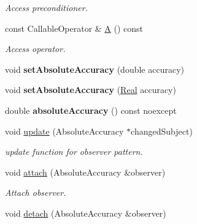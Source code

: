 \begin{DoxyCompactItemize}
\begin{DoxyCompactList}\small\item\em Access preconditioner. \end{DoxyCompactList}\item 
const Callable\+Operator \& \hyperlink{classSpacy_1_1CG_1_1Solver_a9b0fa76350c42fb60b2fbeb40b343fa2}{A} () const 
\begin{DoxyCompactList}\small\item\em Access operator. \end{DoxyCompactList}\item 
\hypertarget{classSpacy_1_1Mixin_1_1AbsoluteAccuracy_a71cfcdc0c504be63c18c3e78df157738}{}void {\bfseries set\+Absolute\+Accuracy} (double accuracy)\label{classSpacy_1_1Mixin_1_1AbsoluteAccuracy_a71cfcdc0c504be63c18c3e78df157738}

\item 
\hypertarget{classSpacy_1_1Mixin_1_1AbsoluteAccuracy_ad099a4a0a770133b56acaaf8783d4ba6}{}void {\bfseries set\+Absolute\+Accuracy} (\hyperlink{classSpacy_1_1Real}{Real} accuracy)\label{classSpacy_1_1Mixin_1_1AbsoluteAccuracy_ad099a4a0a770133b56acaaf8783d4ba6}

\item 
\hypertarget{classSpacy_1_1Mixin_1_1AbsoluteAccuracy_aaa1fbd611cf85a098b71c22986778d8a}{}double {\bfseries absolute\+Accuracy} () const noexcept\label{classSpacy_1_1Mixin_1_1AbsoluteAccuracy_aaa1fbd611cf85a098b71c22986778d8a}

\item 
\hypertarget{classSpacy_1_1Mixin_1_1AbsoluteAccuracy_a7e5910ba9a6ac7a4b332efdbbff27787}{}void \hyperlink{classSpacy_1_1Mixin_1_1AbsoluteAccuracy_a7e5910ba9a6ac7a4b332efdbbff27787}{update} (Absolute\+Accuracy $\ast$changed\+Subject)\label{classSpacy_1_1Mixin_1_1AbsoluteAccuracy_a7e5910ba9a6ac7a4b332efdbbff27787}

\begin{DoxyCompactList}\small\item\em update function for observer pattern. \end{DoxyCompactList}\item 
\hypertarget{classSpacy_1_1Mixin_1_1MixinConnection_abb5520ee6b22dd993d78f142939a1ed4}{}void \hyperlink{classSpacy_1_1Mixin_1_1MixinConnection_abb5520ee6b22dd993d78f142939a1ed4}{attach} (Absolute\+Accuracy \&observer)\label{classSpacy_1_1Mixin_1_1MixinConnection_abb5520ee6b22dd993d78f142939a1ed4}

\begin{DoxyCompactList}\small\item\em Attach observer. \end{DoxyCompactList}\item 
\hypertarget{classSpacy_1_1Mixin_1_1MixinConnection_adda739590c487679c26f60e50aedb73f}{}void \hyperlink{classSpacy_1_1Mixin_1_1MixinConnection_adda739590c487679c26f60e50aedb73f}{detach} (Absolute\+Accuracy \&observer)\label{classSpacy_1_1Mixin_1_1MixinConnection_adda739590c487679c26f60e50aedb73f}


\end{DoxyCompactItemize}
